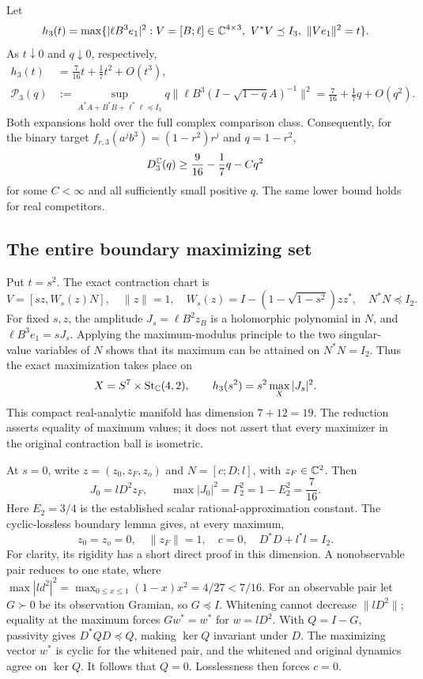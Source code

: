 \begin{theorem}\label{I:R:thm:three-envelope}
Let
\[
 h_3(t)=\max\{|\ell B^3e_1|^2:
 V=[B;\ell]\in\mathbb C^{4\times3},\ V^*V\preceq I_3,
 \ \|Ve_1\|^2=t\}.
\]
As $t\downarrow0$ and $q\downarrow0$, respectively,
\begin{align}
 h_3(t)&=\frac7{16}t+\frac17t^2+O(t^3),
 \label{I:R:eq:three-h}\\
 \mathcal P_3(q)&:=\sup_{A^*A+B^*B+\ell^*\ell\preceq I_3}
 q\|\ell B^3(I-\sqrt{1-q}A)^{-1}\|^2
 =\frac7{16}+\frac17q+O(q^2).
 \label{I:R:eq:three-P}
\end{align}
Both expansions hold over the full complex comparison class.  Consequently,
for the binary target $f_{r,3}(a^jb^3)=(1-r^2)r^j$ and $q=1-r^2$,
\[
 D_3^{\mathbb C}(q)\ge\frac9{16}-\frac17q-Cq^2
\]
for some $C<\infty$ and all sufficiently small positive $q$.
The same lower bound holds for real competitors.
\end{theorem}

\subsection{The entire boundary maximizing set}

Put $t=s^2$.  The exact contraction chart is
\[
 V=[sz,W_s(z)N],\quad \|z\|=1,\quad
 W_s(z)=I-(1-\sqrt{1-s^2})zz^*,\quad N^*N\preceq I_2.
\]
For fixed $s,z$, the amplitude $J_s=\ell B^2z_B$ is a holomorphic
polynomial in $N$, and $\ell B^3e_1=sJ_s$.  Applying the maximum-modulus
principle to the two singular-value variables of $N$ shows that its maximum
can be attained on $N^*N=I_2$.  Thus the exact maximization takes place on
\[
 X=S^7\times\operatorname{St}_{\mathbb C}(4,2),\qquad
 h_3(s^2)=s^2\max_X|J_s|^2.
\]
This compact real-analytic manifold has dimension $7+12=19$.
The reduction asserts equality of maximum values; it does not assert that
every maximizer in the original contraction ball is isometric.

At $s=0$, write $z=(z_0,z_F,z_o)$ and $N=[c;D;l]$, with
$z_F\in\mathbb C^2$. Then
\[
 J_0=lD^2z_F,\qquad
 \max|J_0|^2=\Gamma_2^2=1-E_2^2=\frac7{16}.
\]
Here $E_2=3/4$ is the established scalar rational-approximation constant.
The cyclic-lossless boundary lemma gives, at every maximum,
\[
 z_0=z_o=0,\quad \|z_F\|=1,\quad c=0,\quad D^*D+l^*l=I_2.
\]
For clarity, its rigidity has a short direct proof in this dimension.
A nonobservable pair reduces to one state, where
$\max |ld^2|^2=\max_{0\le x\le1}(1-x)x^2=4/27<7/16$.
For an observable pair let $G\succ0$ be its observation Gramian, so
$G\preceq I$.  Whitening cannot decrease $\|lD^2\|$; equality at the
maximum forces $G w^*=w^*$ for $w=lD^2$.
With $Q=I-G$, passivity gives $D^*QD\preceq Q$, making
$\ker Q$ invariant under $D$.
The maximizing vector $w^*$ is cyclic for the whitened pair, and the
whitened and original dynamics agree on $\ker Q$.
It follows that $Q=0$.  Losslessness then forces $c=0$.

